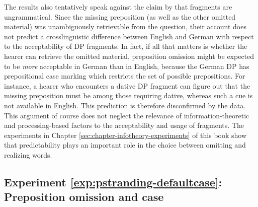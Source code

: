 \newpage
\noindent The results also tentatively speak against the claim by \citet{bergen.goodman2015} that fragments are ungrammatical. Since the missing preposition (as well as the other omitted material) was unambiguously retrievable from the question, their account does not predict a crosslinguistic difference between English and German with respect to the acceptability of DP fragments. In fact, if all that matters is whether the hearer can retrieve the omitted material, preposition omission might be expected to be \textit{more} acceptable in German than in English, because the German DP has prepositional case marking which restricts the set of possible prepositions. For instance, a hearer who encounters a dative DP fragment can figure out that the missing preposition must be among those requiring dative, whereas such a cue is not available in English. This prediction is therefore disconfirmed by the data. This argument of course does not neglect the relevance of information-theoretic and processing-based factors to the acceptability and usage of fragments. The experiments in Chapter \ref{sec:chapter-infotheory-experiments} of this book show that predictability plays an important role in the choice between omitting and realizing words.

\label{exp:pstranding-defaultcase}
\subsection{Experiment \ref{exp:pstranding-defaultcase}: Preposition omission and case}
\label{sec:pstranding-defaultcase}
